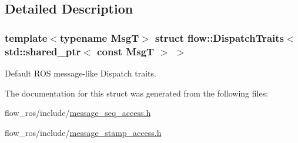 \subsection{Detailed Description}
\subsubsection*{template$<$typename MsgT$>$\newline
struct flow\+::\+Dispatch\+Traits$<$ std\+::shared\+\_\+ptr$<$ const Msg\+T $>$ $>$}

Default R\+OS message-\/like Dispatch traits. 

The documentation for this struct was generated from the following files\+:\begin{DoxyCompactItemize}
\item 
flow\+\_\+ros/include/\hyperlink{message__seq__access_8h}{message\+\_\+seq\+\_\+access.\+h}\item 
flow\+\_\+ros/include/\hyperlink{message__stamp__access_8h}{message\+\_\+stamp\+\_\+access.\+h}\end{DoxyCompactItemize}
